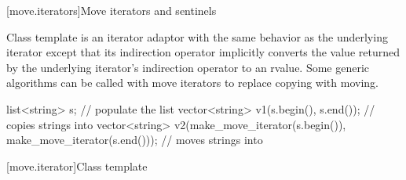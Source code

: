 [move.iterators]{Move iterators and sentinels}

\pnum
Class template  is an iterator adaptor
with the same behavior as the underlying iterator except that its
indirection operator implicitly converts the value returned by the
underlying iterator's indirection operator to an rvalue.
Some generic algorithms can be called with move iterators to replace
copying with moving.

\pnum
\begin{example}

\begin{codeblock}
list<string> s;
// populate the list 
vector<string> v1(s.begin(), s.end());          // copies strings into 
vector<string> v2(make_move_iterator(s.begin()),
                  make_move_iterator(s.end())); // moves strings into 
\end{codeblock}

\end{example}

[move.iterator]{Class template }

